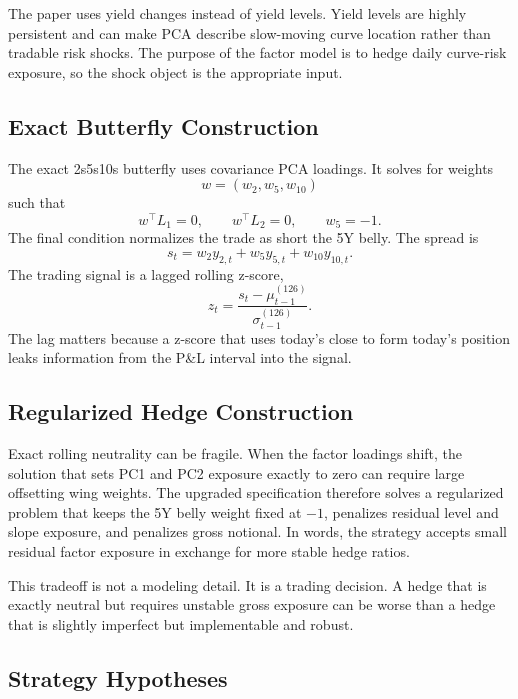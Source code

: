 \documentclass[12pt]{article}
\begin{document}
The paper uses yield changes instead of yield levels. Yield levels are highly persistent and can make
PCA describe slow-moving curve location rather than tradable risk shocks. The purpose of the
factor model is to hedge daily curve-risk exposure, so the shock object is the appropriate input.

\subsection{Exact Butterfly Construction}

The exact 2s5s10s butterfly uses covariance PCA loadings. It solves for weights
\[
    w=(w_2,w_5,w_{10})
\]
such that
\begin{equation}
    w^\top L_1 = 0, \qquad
    w^\top L_2 = 0, \qquad
    w_5 = -1.
\end{equation}
The final condition normalizes the trade as short the 5Y belly. The spread is
\begin{equation}
    s_t = w_2 y_{2,t} + w_5 y_{5,t} + w_{10} y_{10,t}.
\end{equation}
The trading signal is a lagged rolling z-score,
\begin{equation}
    z_t = \frac{s_t-\mu_{t-1}^{(126)}}{\sigma_{t-1}^{(126)}}.
\end{equation}
The lag matters because a z-score that uses today's close to form today's position leaks
information from the P\&L interval into the signal.

\subsection{Regularized Hedge Construction}

Exact rolling neutrality can be fragile. When the factor loadings shift, the solution that sets PC1
and PC2 exposure exactly to zero can require large offsetting wing weights. The upgraded
specification therefore solves a regularized problem that keeps the 5Y belly weight fixed at $-1$,
penalizes residual level and slope exposure, and penalizes gross notional. In words, the strategy
accepts small residual factor exposure in exchange for more stable hedge ratios.

This tradeoff is not a modeling detail. It is a trading decision. A hedge that is exactly neutral but
requires unstable gross exposure can be worse than a hedge that is slightly imperfect but
implementable and robust.

\subsection{Strategy Hypotheses}
\end{document}
